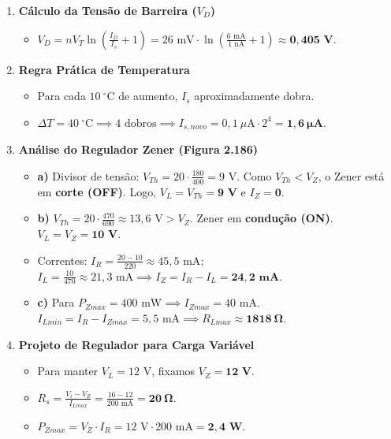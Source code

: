 \documentclass[a4paper,12pt]{article}
\begin{document}
\begin{enumerate}[label=\textbf{Questão \arabic*:}, leftmargin=*]
    \item \textbf{Cálculo da Tensão de Barreira ($V_D$)}
    \begin{itemize}
        \item $V_D = nV_T \ln\left(\frac{I_D}{I_s} + 1\right) = 26\text{ mV} \cdot \ln\left(\frac{6\text{ mA}}{1\text{ nA}} + 1\right) \approx \mathbf{0,405\text{ V}}$.
    \end{itemize}

    \item \textbf{Regra Prática de Temperatura}
    \begin{itemize}
        \item Para cada $10~^\circ\text{C}$ de aumento, $I_s$ aproximadamente dobra.
        \item $\Delta T = 40~^\circ\text{C} \implies 4 \text{ dobros} \implies I_{s,novo} = 0,1~\mu\text{A} \cdot 2^4 = \mathbf{1,6~\mu\text{A}}$.
    \end{itemize}

    \item \textbf{Análise do Regulador Zener (Figura 2.186)}
    \begin{itemize}
        \item \textbf{a)} Divisor de tensão: $V_{Th} = 20 \cdot \frac{180}{400} = 9\text{ V}$. Como $V_{Th} < V_Z$, o Zener está em \textbf{corte (OFF)}. Logo, $V_L = V_{Th} = \mathbf{9\text{ V}}$ e $I_Z = \mathbf{0}$.
        \item \textbf{b)} $V_{Th} = 20 \cdot \frac{470}{690} \approx 13,6\text{ V} > V_Z$. Zener em \textbf{condução (ON)}. $V_L = V_Z = \mathbf{10\text{ V}}$.
        \item Correntes: $I_R = \frac{20-10}{220} \approx 45,5\text{ mA}$; $I_L = \frac{10}{470} \approx 21,3\text{ mA} \implies I_Z = I_R - I_L = \mathbf{24,2\text{ mA}}$.
        \item \textbf{c)} Para $P_{Zmax} = 400\text{ mW} \implies I_{Zmax} = 40\text{ mA}$. $I_{Lmin} = I_R - I_{Zmax} = 5,5\text{ mA} \implies R_{Lmax} \approx \mathbf{1818~\Omega}$.
    \end{itemize}

    \item \textbf{Projeto de Regulador para Carga Variável}
    \begin{itemize}
        \item Para manter $V_L=12\text{ V}$, fixamos $V_Z = \mathbf{12\text{ V}}$.
        \item $R_s = \frac{V_i - V_Z}{I_{Lmax}} = \frac{16-12}{200\text{ mA}} = \mathbf{20~\Omega}$.
        \item $P_{Zmax} = V_Z \cdot I_{R} = 12\text{ V} \cdot 200\text{ mA} = \mathbf{2,4\text{ W}}$.
    \end{itemize}


\end{enumerate}
\end{document}
